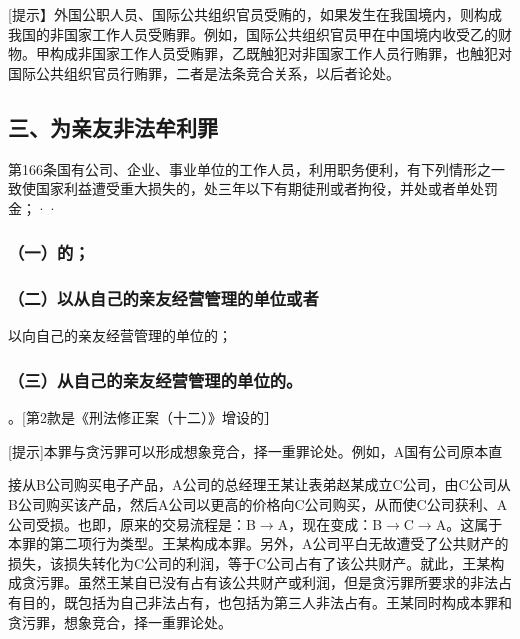 [提示】外国公职人员、国际公共组织官员受贿的，如果发生在我国境内，则构成我国的非国家工作人员受贿罪。例如，国际公共组织官员甲在中国境内收受乙的财物。甲构成非国家工作人员受贿罪，乙既触犯对非国家工作人员行贿罪，也触犯对国际公共组织官员行贿罪，二者是法条竞合关系，以后者论处。

\subsection*{三、为亲友非法牟利罪}

第166条国有公司、企业、事业单位的工作人员，利用职务便利，有下列情形之一致使国家利益遭受重大损失的，处三年以下有期徒刑或者拘役，并处或者单处罚金；··

\subsubsection*{（一）的；}

\subsubsection*{（二）以从自己的亲友经营管理的单位或者}

以向自己的亲友经营管理的单位的；

\subsubsection*{（三）从自己的亲友经营管理的单位的。}

。[第2款是《刑法修正案（十二）》增设的］

[提示]本罪与贪污罪可以形成想象竞合，择一重罪论处。例如，A国有公司原本直

接从B公司购买电子产品，A公司的总经理王某让表弟赵某成立C公司，由C公司从B公司购买该产品，然后A公司以更高的价格向C公司购买，从而使C公司获利、A公司受损。也即，原来的交易流程是：B\ensuremath{\rightarrow}A，现在变成：B\ensuremath{\rightarrow}C\ensuremath{\rightarrow}A。这属于本罪的第二项行为类型。王某构成本罪。另外，A公司平白无故遭受了公共财产的损失，该损失转化为C公司的利润，等于C公司占有了该公共财产。就此，王某构成贪污罪。虽然王某自已没有占有该公共财产或利润，但是贪污罪所要求的非法占有目的，既包括为自己非法占有，也包括为第三人非法占有。王某同时构成本罪和贪污罪，想象竞合，择一重罪论处。


